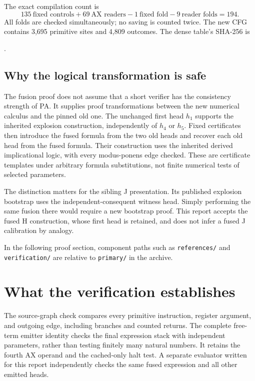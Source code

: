 \documentclass[11pt,a4paper]{article}
\theoremstyle{definition}\newtheorem{definition}[theorem]{Definition}
\theoremstyle{remark}\newtheorem{remark}[theorem]{Remark}
\newcommand{\file}[1]{\nolinkurl{#1}}
\begin{document}
The exact compilation count is
\[
 135\ \text{fixed controls}+69\ \text{AX readers}
 -1\ \text{fixed fold}-9\ \text{reader folds}=194.
\]
All folds are checked simultaneously; no saving is counted twice.
The new CFG contains 3,695 primitive sites and 4,809 outcomes. The dense
table's SHA-256 is
\begin{center}\footnotesize
{}.
\end{center}

\subsection{Why the logical transformation is safe}

The fusion proof does not assume that a short verifier has the consistency
strength of PA. It supplies proof transformations between the new numerical
calculus and the pinned old one. The unchanged first head $h_1$ supports
the inherited explosion construction, independently of $h_4$ or $h_5$.
Fixed certificates then introduce the fused formula from the two old heads
and recover each old head from the fused formula. Their construction uses
the inherited derived implicational logic, with every modus-ponens edge
checked. These are certificate templates under arbitrary formula
substitutions, not finite numerical tests of selected parameters.

The distinction matters for the sibling J presentation. Its published
explosion bootstrap uses the independent-consequent witness head. Simply
performing the same fusion there would require a new bootstrap proof.
This report accepts the fused H construction, whose first head is retained,
and does not infer a fused J calibration by analogy.

In the following proof section, component paths such as
\file{references/} and \file{verification/} are relative to
\file{primary/} in the archive.



\section{What the verification establishes}



The source-graph check compares every primitive instruction, register
argument, and outgoing edge, including branches and counted returns.
The complete free-term emitter identity checks the final expression stack
with independent parameters, rather than testing finitely many natural
numbers. It retains the fourth AX operand and the cached-only halt test.
A separate evaluator written for this report independently checks the
same fused expression and all other emitted heads.
\end{document}
